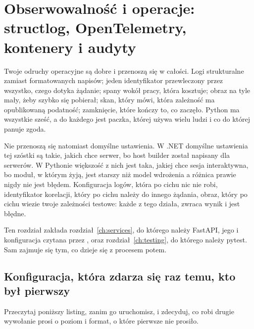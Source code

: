 
\chapter{Obserwowalność i operacje: structlog, OpenTelemetry, kontenery i audyty}
\label{ch:observability}

\noindent
Twoje odruchy operacyjne są dobre i przenoszą się w całości. Logi
strukturalne zamiast formatowanych napisów; jeden identyfikator
przewleczony przez wszystko, czego dotyka żądanie; spany wokół pracy, która
kosztuje; obraz na tyle mały, żeby szybko się pobierał; skan, który mówi,
która zależność ma opublikowaną podatność; zamknięcie, które kończy to, co
zaczęło. Python ma wszystkie sześć, a do każdego jest paczka, której używa
wielu ludzi i co do której panuje zgoda.

Nie przenoszą się natomiast domyślne ustawienia. W .NET domyślne ustawienia
tej szóstki są takie, jakich chce serwer, bo host builder został napisany
dla serwerów. W Pythonie większość z nich jest taka, jakiej chce sesja
interaktywna, bo moduł, w którym żyją, jest starszy niż model wdrożenia
\dash{} a różnica prawie nigdy nie jest błędem. Konfiguracja logów, która po
cichu nic nie robi, identyfikator korelacji, który po cichu należy do innego
żądania, obraz, który po cichu wiezie twoje zależności testowe: każde z tego
działa, zwraca wynik i jest błędne.

Ten rozdział zakłada rozdział~\ref{ch:services}, do którego należy
FastAPI, jego  i konfiguracja czytana przez
, oraz rozdział~\ref{ch:testing}, do którego należy
pytest. Sam zajmuje się tym, co dzieje się z procesem potem.

\section{Konfiguracja, która zdarza się raz \dash{} temu, kto był pierwszy}
\label{sec:ch12-logging}

Przeczytaj poniższy listing, zanim go uruchomisz, i zdecyduj, co robi drugie
wywołanie  \dash{} prosi o poziom i format, o które
pierwsze nie prosiło.


